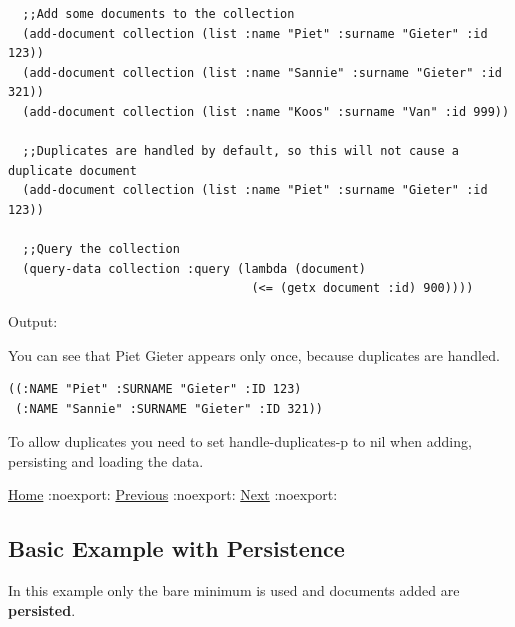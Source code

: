\documentclass[11pt]{article}
\begin{document}
\begin{verbatim}
  ;;Add some documents to the collection
  (add-document collection (list :name "Piet" :surname "Gieter" :id 123))
  (add-document collection (list :name "Sannie" :surname "Gieter" :id 321))
  (add-document collection (list :name "Koos" :surname "Van" :id 999))

  ;;Duplicates are handled by default, so this will not cause a duplicate document
  (add-document collection (list :name "Piet" :surname "Gieter" :id 123))

  ;;Query the collection
  (query-data collection :query (lambda (document)
                                  (<= (getx document :id) 900))))
\end{verbatim}

Output:

You can see that Piet Gieter appears only once, because duplicates are handled.

\begin{verbatim}
((:NAME "Piet" :SURNAME "Gieter" :ID 123)
 (:NAME "Sannie" :SURNAME "Gieter" :ID 321))
\end{verbatim}

To allow duplicates you need to set handle-duplicates-p to nil when
adding, persisting and loading the data.

\href{home.org}{Home} :noexport: \href{definitions-example.org}{Previous} :noexport: \href{basic-example-with-persistence.org}{Next} :noexport:
\subsection{Basic Example with Persistence}
\label{sec:org0009360}

In this example only the bare minimum is used and documents added are \textbf{\textbf{persisted}}.
\end{document}
